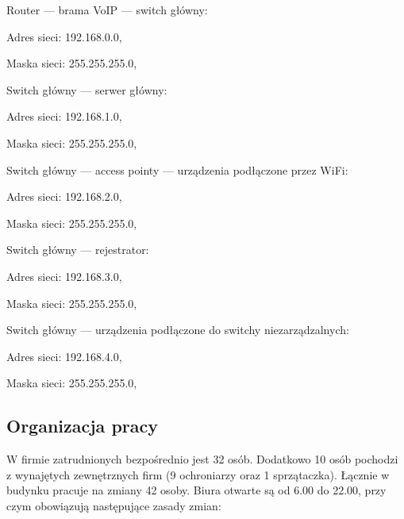 \begin{minipage}[\right]{15cm}
\begin{itemize*}
	\item Router --- brama VoIP --- switch główny:
	\begin{itemize*}
		\item Adres sieci: 192.168.0.0,
		\item Maska sieci: 255.255.255.0,
	\end{itemize*}
	\item Switch główny --- serwer główny:
	\begin{itemize*}
		\item Adres sieci: 192.168.1.0,
		\item Maska sieci: 255.255.255.0,
	\end{itemize*}
	\item Switch główny --- access pointy --- urządzenia podłączone przez WiFi:
	\begin{itemize*}
		\item Adres sieci: 192.168.2.0,
		\item Maska sieci: 255.255.255.0,
	\end{itemize*}
	\item Switch główny --- rejestrator:
	\begin{itemize*}
		\item Adres sieci: 192.168.3.0,
		\item Maska sieci: 255.255.255.0,
	\end{itemize*}
	\item Switch główny --- urządzenia podłączone do switchy niezarządzalnych:
	\begin{itemize*}
		\item Adres sieci: 192.168.4.0,
		\item Maska sieci: 255.255.255.0,
	\end{itemize*}
\end{itemize*}
\end{minipage}

\newpage
\subsection{Organizacja pracy}
W firmie zatrudnionych bezpośrednio jest 32 osób. Dodatkowo 10 osób pochodzi z wynajętych zewnętrznych firm (9 ochroniarzy oraz 1 sprzątaczka). Łącznie w budynku pracuje na zmiany 42 osoby. Biura otwarte są od 6.00 do 22.00, przy czym obowiązują następujące zasady zmian:

